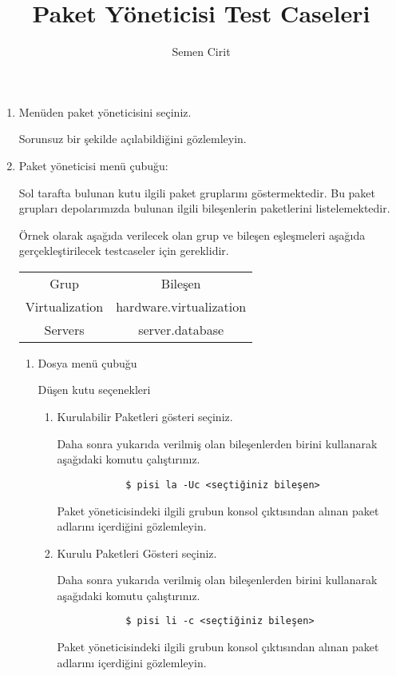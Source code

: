 \documentclass[a4paper,10pt]{article}
\title{Paket Yöneticisi Test Caseleri}
\author{Semen Cirit}
\begin{document}
\maketitle

\begin{enumerate}
    \item Menüden paket yöneticisini seçiniz.
	
	  Sorunsuz bir şekilde açılabildiğini gözlemleyin.
 

    \item Paket yöneticisi menü çubuğu:

    Sol tarafta bulunan kutu ilgili paket gruplarını göstermektedir. Bu paket grupları depolarımızda bulunan ilgili bileşenlerin paketlerini listelemektedir.

    Örnek olarak aşağıda verilecek olan grup ve bileşen eşleşmeleri aşağıda gerçekleştirilecek testcaseler için gereklidir.
     \begin{table}[h]
	  \centering
	  \begin{tabular}{|c|c|}
		  \hline
		  Grup & Bileşen \\
		  Virtualization & hardware.virtualization \\
		  Servers & server.database \\
		  \hline
	  \end{tabular} 
	  \label{tab:tbl}
    \end{table}
    
    \begin{enumerate}
        \item Dosya menü çubuğu
    
        Düşen kutu seçenekleri
        \begin{enumerate}
            \item Kurulabilir Paketleri gösteri seçiniz.
            
	     Daha sonra yukarıda verilmiş olan bileşenlerden birini kullanarak aşağıdaki komutu çalıştırınız.
            \begin{verbatim}
            $ pisi la -Uc <seçtiğiniz bileşen>
            \end{verbatim}
            Paket yöneticisindeki ilgili grubun konsol çıktısından alınan paket adlarını içerdiğini gözlemleyin.
            \item Kurulu Paketleri Gösteri seçiniz.

             Daha sonra yukarıda verilmiş olan bileşenlerden birini kullanarak aşağıdaki komutu çalıştırınız.
            \begin{verbatim}
            $ pisi li -c <seçtiğiniz bileşen>
            \end{verbatim}
            Paket yöneticisindeki ilgili grubun konsol çıktısından alınan paket adlarını içerdiğini gözlemleyin.
    

\end{enumerate}
\end{enumerate}
\end{enumerate}
\end{document}
